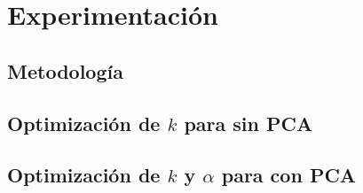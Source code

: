 \section{Experimentación}%
\label{sec:experimentacion}

\subsection{Metodología}%
\label{sub:metodologia}

\subsection{Optimización de $k$ para \knn{} sin PCA}%
\label{sub:knn_sin_pca}

\subsection{Optimización de $k$ y $\alpha$ para \knn{} con PCA}%
\label{sub:alpha_k_knn_pca}
